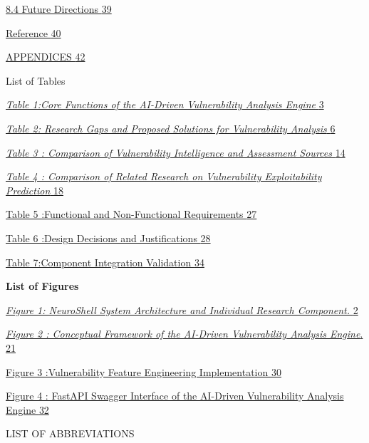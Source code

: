 \documentclass[
]{article}
\begin{document}
\protect\hyperlink{future-directions}{8.4 Future Directions
\protect\hyperlink{future-directions}{39}}

\protect\hyperlink{_Toc242376656}{Reference
\protect\hyperlink{_Toc242376656}{40}}

\protect\hyperlink{appendices}{APPENDICES
\protect\hyperlink{appendices}{42}}

List of Tables

\protect\hyperlink{_Toc242364553}{\emph{Table 1:Core Functions of the
AI-Driven Vulnerability Analysis Engine}
\protect\hyperlink{_Toc242364553}{3}}

\protect\hyperlink{_Toc242364554}{\emph{Table 2: Research Gaps and
Proposed Solutions for Vulnerability Analysis}
\protect\hyperlink{_Toc242364554}{6}}

\protect\hyperlink{_Toc242364555}{\emph{Table 3 : Comparison of
Vulnerability Intelligence and Assessment Sources}
\protect\hyperlink{_Toc242364555}{14}}

\protect\hyperlink{_Toc242364556}{\emph{Table 4 : Comparison of Related
Research on Vulnerability Exploitability Prediction}
\protect\hyperlink{_Toc242364556}{18}}

\protect\hyperlink{_Toc242368668}{Table 5 :Functional and Non-Functional
Requirements \protect\hyperlink{_Toc242368668}{27}}

\protect\hyperlink{_Toc242375180}{Table 6 :Design Decisions and
Justifications \protect\hyperlink{_Toc242375180}{28}}

\protect\hyperlink{_Toc242368670}{Table 7:Component Integration
Validation \protect\hyperlink{_Toc242368670}{34}}

\textbf{List of Figures}

\protect\hyperlink{_Toc242364476}{\emph{Figure 1: NeuroShell System
Architecture and Individual Research Component.}
\protect\hyperlink{_Toc242364476}{2}}

\protect\hyperlink{_Toc242364477}{\emph{Figure 2 : Conceptual Framework
of the AI-Driven Vulnerability Analysis Engine}.
\protect\hyperlink{_Toc242364477}{21}}

\protect\hyperlink{_Toc242372687}{Figure 3 :Vulnerability Feature
Engineering Implementation \protect\hyperlink{_Toc242372687}{30}}

\protect\hyperlink{_Toc242372688}{Figure 4 : FastAPI Swagger Interface
of the AI-Driven Vulnerability Analysis Engine
\protect\hyperlink{_Toc242372688}{32}}

LIST OF ABBREVIATIONS
\end{document}
